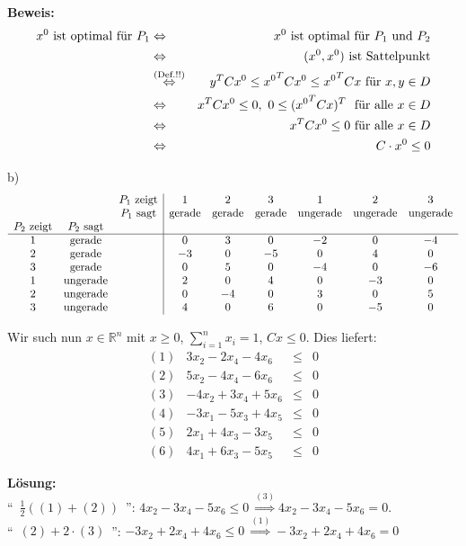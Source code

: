 \documentclass[a4paper,11pt,twoside,titlepage]{article}
\newcommand{\R}{{\mathbb R}}
\begin{document}
\textbf{Beweis:} 
\begin{eqnarray*}
x^0 \textnormal{ ist optimal für } P_1 &\Leftrightarrow& x^0 \textnormal{ ist optimal für }P_1 \textnormal{ und } P_2\\
\ &\Leftrightarrow& (x^0,x^0)\textnormal{ ist Sattelpunkt}\\
\ &\stackrel{\textnormal{(Def.!!)}}{\Leftrightarrow}& y^TCx^0\le {x^0}^T Cx^0\le {x^0}^T C x\textnormal{ für } x,y\in D\\
\ &\Leftrightarrow& x^TC x^0\le 0,\ 0\le({x^0}^TC x)^T\ \textnormal{ für alle } x\in D\\
\ &\Leftrightarrow& x^TC x^0\le 0 \textnormal{ für alle } x\in D\\
\ &\Leftrightarrow& C\cdot x^0\le 0
\end{eqnarray*}

b)
\[
\begin{array}{ccc|cccccc}
 & &P_1$ zeigt$&1&2&3&1&2&3\\
 & &P_1$ sagt$&$gerade$&$gerade$&$gerade$&$ungerade$&$ungerade$&$ungerade$\\
P_2$ zeigt$&P_2$ sagt$& \\\hline
1&$gerade$&&0&3&0&-2&0&-4\\
2&$gerade$&&-3&0&-5&0&4&0\\
3&$gerade$&&0&5&0&-4&0&-6\\
1&$ungerade$&&2&0&4&0&-3&0\\
2&$ungerade$&&0&-4&0&3&0&5\\
3&$ungerade$&&4&0&6&0&-5&0\\
\end{array}
\]

Wir such nun $x\in\R^n$ mit $x\ge0$, $\sum\limits_{i=1}^nx_i=1$, $Cx\le 0$.
Dies liefert:
\[
\begin{array}{crcl}
(1)& 3x_2-2x_4-4x_6&\le&0\\
(2)& 5x_2-4x_4-6x_6&\le&0\\
(3)& -4x_2+3x_4+5x_6&\le&0\\
(4)& -3x_1-5x_3+4x_5&\le&0\\
(5)& 2x_1+4x_3-3x_5&\le&0\\
(6)& 4x_1+6x_3-5x_5&\le&0
\end{array}
\]

\textbf{Lösung:}\\
"`~$\frac{1}{2}((1)+(2))$~"': $4x_2-3x_4-5x_6 \le 0\ \stackrel{(3)}{\Rightarrow}4x_2-3x_4-5x_6=0.$\\
"`~$(2)+2\cdot(3)$~"': $-3x_2+2x_4+4x_6\le 0\ \stackrel{(1)}{\Rightarrow}-3x_2+2x_4+4x_6=0$
\end{document}
